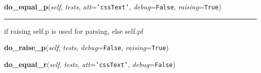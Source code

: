     \vspace{0.5ex}

\hspace{.8\funcindent}\begin{boxedminipage}{\funcwidth}

    \raggedright \textbf{do\_equal\_p}(\textit{self}, \textit{tests}, \textit{att}={\tt \texttt{'}\texttt{cssText}\texttt{'}}, \textit{debug}={\tt False}, \textit{raising}={\tt True})

    \vspace{-1.5ex}

    \rule{\textwidth}{0.5\fboxrule}
\setlength{\parskip}{2ex}
    if raising self.p is used for parsing, else self.pf

\setlength{\parskip}{1ex}
    \end{boxedminipage}

    \label{cssutils:tests:basetest:BaseTestCase:do_raise_p}

    \vspace{0.5ex}

\hspace{.8\funcindent}\begin{boxedminipage}{\funcwidth}

    \raggedright \textbf{do\_raise\_p}(\textit{self}, \textit{tests}, \textit{debug}={\tt False}, \textit{raising}={\tt True})

\setlength{\parskip}{2ex}
\setlength{\parskip}{1ex}
    \end{boxedminipage}

    \label{cssutils:tests:basetest:BaseTestCase:do_equal_r}

    \vspace{0.5ex}

\hspace{.8\funcindent}\begin{boxedminipage}{\funcwidth}

    \raggedright \textbf{do\_equal\_r}(\textit{self}, \textit{tests}, \textit{att}={\tt \texttt{'}\texttt{cssText}\texttt{'}}, \textit{debug}={\tt False})

\setlength{\parskip}{2ex}
\setlength{\parskip}{1ex}
    \end{boxedminipage}

